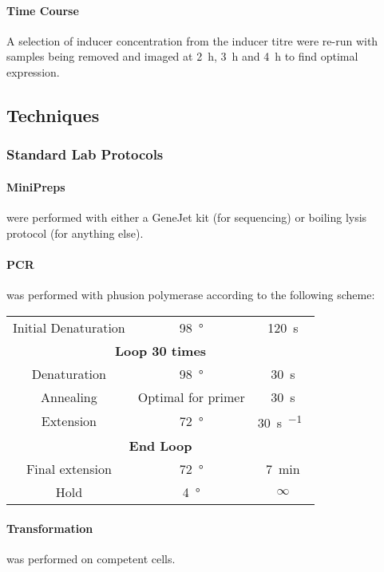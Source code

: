 \documentclass[../main.tex]{subfiles}
\begin{document}
\paragraph{Time Course}	A selection of inducer concentration from the inducer titre were re-run with samples being removed and imaged at \SI{2}{\hour}, \SI{3}{\hour} and \SI{4}{\hour} to find optimal expression.
  
\subsection{Techniques}

\subsubsection{Standard Lab Protocols}
\paragraph{MiniPreps} were performed with either a GeneJet kit (for sequencing) or boiling lysis protocol (for anything else).
\paragraph{PCR} was performed with phusion polymerase according to the following scheme:

\begin{center}
\begin{tabular}{ccc}
Initial Denaturation	& \SI{98}{\degree} & \SI{120}{\second}\\
\multicolumn{3}{c}{\textbf{Loop 30 times}}\\
Denaturation		&	\SI{98}{\degree}		&	\SI{30}{\second}\\
Annealing 		&	Optimal for primer	&	\SI{30}{\second}\\
Extension		&	\SI{72}{\degree}		&	\SI{30}{\second\per\kilo\base}\\
\multicolumn{3}{c}{\textbf{End Loop}}\\
Final extension	&	\SI{72}{\degree}		&	\SI{7}{\minute}\\
Hold				&	\SI{4}{\degree}		&	\(\infty\)
\end{tabular}
\end{center}

\paragraph{Transformation} was performed on  competent cells.
\end{document}
